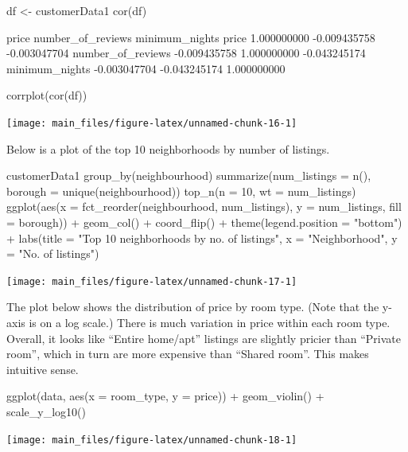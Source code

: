 \begin{Schunk}
\begin{Sinput}
df  <- customerData1  %
cor(df)
\end{Sinput}
\begin{Soutput}
                         price number_of_reviews minimum_nights
price              1.000000000      -0.009435758   -0.003047704
number_of_reviews -0.009435758       1.000000000   -0.043245174
minimum_nights    -0.003047704      -0.043245174    1.000000000
\end{Soutput}
\begin{Sinput}
corrplot(cor(df))
\end{Sinput}


\begin{center}\texttt{[image: main\_files/figure-latex/unnamed-chunk-16-1]} \end{center}

\end{Schunk}

Below is a plot of the top 10 neighborhoods by number of listings.

\begin{Schunk}
\begin{Sinput}
customerData1 %
    group_by(neighbourhood) %
    summarize(num_listings = n(), 
              borough = unique(neighbourhood)) %
    top_n(n = 10, wt = num_listings) %
    ggplot(aes(x = fct_reorder(neighbourhood, num_listings), 
               y = num_listings, fill = borough)) +
    geom_col() +
    coord_flip() +
    theme(legend.position = "bottom") +
    labs(title = "Top 10 neighborhoods by no. of listings",
         x = "Neighborhood", y = "No. of listings")
\end{Sinput}


\begin{center}\texttt{[image: main\_files/figure-latex/unnamed-chunk-17-1]} \end{center}

\end{Schunk}

The plot below shows the distribution of price by room type. (Note that
the y-axis is on a log scale.) There is much variation in price within
each room type. Overall, it looks like ``Entire home/apt'' listings are
slightly pricier than ``Private room'', which in turn are more expensive
than ``Shared room''. This makes intuitive sense.

\begin{Schunk}
\begin{Sinput}
ggplot(data, aes(x = room_type, y = price)) +
    geom_violin() +
    scale_y_log10()
\end{Sinput}


\begin{center}\texttt{[image: main\_files/figure-latex/unnamed-chunk-18-1]} \end{center}

\end{Schunk}


